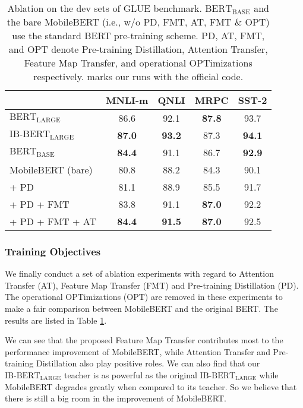 \documentclass[11pt,a4paper]{article}
\begin{document}
\setlength{\tabcolsep}{3pt}
\begin{table}[t]
\begin{center}
	    \small
		\begin{tabular}{l | c c c c}
			\hline
            & \textbf{MNLI-m} & \textbf{QNLI} & \textbf{MRPC} & \textbf{SST-2}\\
			\hline
			$\text{BERT}_\text{LARGE}$ & 86.6 & 92.1\dag & \textbf{87.8} & 93.7\\
			$\text{IB-BERT}_\text{LARGE}$ & \textbf{87.0} & \textbf{93.2} & 87.3 & \textbf{94.1}\\
			\hline
			$\text{BERT}_\text{BASE}$ & \textbf{84.4} & 91.1\dag & 86.7 & \textbf{92.9}\\
MobileBERT (bare)  & 80.8 & 88.2 & 84.3 & 90.1\\
			 \quad + PD & 81.1 & 88.9 & 85.5 & 91.7 \\
			 \quad + PD + FMT  & 83.8 & 91.1 & \textbf{87.0} & 92.2 \\
			 \quad + PD + FMT + AT & \textbf{84.4} & \textbf{91.5} & \textbf{87.0} & 92.5\\
\hline
		\end{tabular}
	\end{center}
	\caption[Caption for LOF]{Ablation on the dev sets of GLUE benchmark.  $\text{BERT}_\text{BASE}$ and the bare MobileBERT (i.e., w/o PD, FMT, AT, FMT \& OPT) use the standard BERT pre-training scheme. PD, AT, FMT, and OPT denote Pre-training Distillation, Attention Transfer, Feature Map Transfer, and operational OPTimizations respectively. \dag marks our runs with the official code. }
	\label{tab:ablation}
\end{table}
\setlength{\tabcolsep}{6pt}

\subsubsection{Training Objectives}\label{sec:ablation}





We finally conduct a set of ablation experiments with regard to Attention Transfer (AT), Feature Map Transfer (FMT) and Pre-training Distillation (PD). The operational OPTimizations (OPT) are removed in these experiments to make a fair comparison between MobileBERT and the original BERT. The results are listed in Table \ref{tab:ablation}.


We can see that the proposed Feature Map Transfer contributes most to the performance improvement of MobileBERT, while Attention Transfer and Pre-training Distillation also play positive roles.
We can also find that our $\text{IB-BERT}_\text{LARGE}$ teacher is as powerful as the original $\text{IB-BERT}_\text{LARGE}$ while MobileBERT degrades greatly when compared to its teacher. So we believe that there is still a big room in the improvement of MobileBERT.
\end{document}

